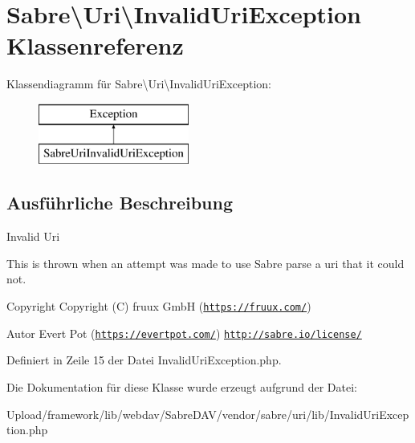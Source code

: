 \hypertarget{class_sabre_1_1_uri_1_1_invalid_uri_exception}{}\section{Sabre\textbackslash{}Uri\textbackslash{}Invalid\+Uri\+Exception Klassenreferenz}
\label{class_sabre_1_1_uri_1_1_invalid_uri_exception}
Klassendiagramm für Sabre\textbackslash{}Uri\textbackslash{}Invalid\+Uri\+Exception\+:\begin{figure}[H]
\begin{center}
\leavevmode
\includegraphics[height=2.000000cm]{class_sabre_1_1_uri_1_1_invalid_uri_exception}
\end{center}
\end{figure}


\subsection{Ausführliche Beschreibung}
Invalid Uri

This is thrown when an attempt was made to use Sabre parse a uri that it could not.

\begin{DoxyCopyright}{Copyright}
Copyright (C) fruux GmbH (\href{https://fruux.com/}{\tt https\+://fruux.\+com/}) 
\end{DoxyCopyright}
\begin{DoxyAuthor}{Autor}
Evert Pot (\href{https://evertpot.com/}{\tt https\+://evertpot.\+com/})  \href{http://sabre.io/license/}{\tt http\+://sabre.\+io/license/} 
\end{DoxyAuthor}


Definiert in Zeile 15 der Datei Invalid\+Uri\+Exception.\+php.



Die Dokumentation für diese Klasse wurde erzeugt aufgrund der Datei\+:\begin{DoxyCompactItemize}
\item 
Upload/framework/lib/webdav/\+Sabre\+D\+A\+V/vendor/sabre/uri/lib/Invalid\+Uri\+Exception.\+php\end{DoxyCompactItemize}
